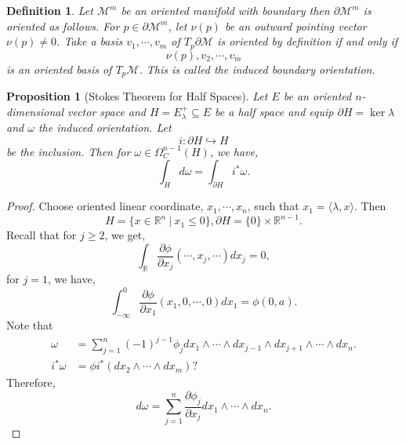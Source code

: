 \documentclass[10pt]{article}
\newtheorem{proposition}{Proposition}[section]
\newtheorem{definition}{Definition}[section]
\newcommand{\R}[0]{\mathbb{R}}
\newcommand{\M}[0]{\mathcal{M}}
\newcommand{\sep}[0]{\:|\:}
\newcommand{\pd}[2]{{\frac {\partial #1} {\partial #2}}}
\begin{document}
\begin{definition}
  Let $\M^m$ be an oriented manifold with boundary then $\partial \M^m$ is oriented as follows. For $p\in\partial \M^m$, let $\nu(p)$ be an outward pointing vector $\nu(p)\not=0$. Take a basis $v_1,\cdots,v_m$ of $T_p\partial\M$ is oriented by definition if and only if 
  \begin{equation*}
    \nu(p),v_2,\cdots,v_m
  \end{equation*}
  is an oriented basis of $T_p\M$. This is called the induced boundary orientation.
\end{definition} 

\begin{proposition}[Stokes Theorem for Half Spaces]
  Let $E$ be an oriented $n$-dimensional vector space and $H = E^+_\lambda\subseteq E$ be a half space and equip $\partial H = \ker\lambda$ and $\omega$ the induced orientation. Let 
  \begin{equation*}
    i:\partial H\hookrightarrow H
  \end{equation*}
  be the inclusion. Then for $\omega\in\Omega_C^{n-1}(H)$, we have,
  \begin{equation*}
    \int_Hd\omega = \int_{\partial H}i^*\omega.
  \end{equation*}
\end{proposition}

\begin{proof}
Choose oriented linear coordinate, $x_1,\cdots,x_n$, such that $x_1 = \langle \lambda,x\rangle$. Then 
\begin{equation*}
  H = \{x\in\R^n\sep x_1\leq 0\}, \partial H=\{0\}\times\R^{n-1}.
\end{equation*}
Recall that for $j\geq 2$, we get,
\begin{equation*}
  \int_\R\pd{\phi}{x_j}(\cdots,x_j,\cdots)dx_j=0,
\end{equation*}
for $j=1$, we have,
\begin{equation*}
  \int_{-\infty}^0\pd{\phi}{x_1}(x_1,0,\cdots,0)dx_1 = \phi(0,a).
\end{equation*}
Note that 
\begin{align*}
  \omega &= \sum_{j=1}^n(-1)^{j-1}\phi_jdx_1\wedge\cdots\wedge dx_{j-1}\wedge dx_{j+1}\wedge\cdots\wedge dx_n.\\
  i^*\omega &= \phi i^*(dx_2\wedge\cdots\wedge dx_m)?
\end{align*}
Therefore,
\begin{equation*}
  d\omega = \sum_{j=1}^n \pd{\phi_j}{x_j}dx_1\wedge\cdots\wedge dx_n.
\end{equation*}
\end{proof}
\end{document}
